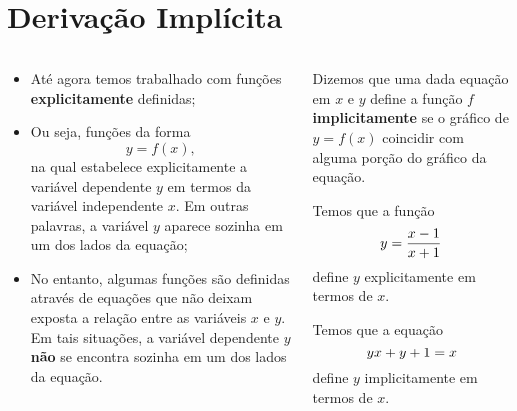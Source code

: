 \section{Derivação Implícita}

\begin{frame}
  \begin{columns}[onlytextwidth]
    \begin{column}{0.49\textwidth}\vspace*{-0.5cm}\small
      \begin{itemize}
        \item Até agora temos trabalhado com funções \textbf{explicitamente} definidas;
        \item Ou seja, funções da forma
        \begin{equation*}
          y = f(x),
        \end{equation*}
        na qual estabelece explicitamente a variável dependente $y$ em termos da variável independente $x$. Em outras palavras, {\color{black}a variável $y$ aparece sozinha em um dos lados da equação;}
        \item No entanto, algumas funções são definidas através de equações que não deixam exposta a relação entre as variáveis $x$ e $y$. Em tais situações, {\color{black} a variável dependente $y$ \textbf{não} se encontra sozinha em um dos lados da equação.}
      \end{itemize}
    \end{column}
    \begin{column}{0.49\textwidth}\vspace*{-0.5cm}
      \begin{definition}
        Dizemos que uma dada equação em $x$ e $y$ define a função $f$ \textbf{implicitamente} se o gráfico de $y=f(x)$ coincidir com alguma porção do gráfico da equação.
      \end{definition}
      \begin{example-highlight}
        Temos que a função\vspace*{-0.2cm}
        \begin{equation*}
          y = \frac{x-1}{x+1}\vspace*{-0.2cm}
        \end{equation*}
        define $y$ explicitamente em termos de $x$.
      \end{example-highlight}
      \begin{example-highlight}
        Temos que a equação\vspace*{-0.2cm}
        \begin{equation*}
          yx + y + 1 = x\vspace*{-0.2cm}
        \end{equation*}
        define $y$ implicitamente em termos de $x$.
      \end{example-highlight}
    \end{column}
  \end{columns}
\end{frame}

